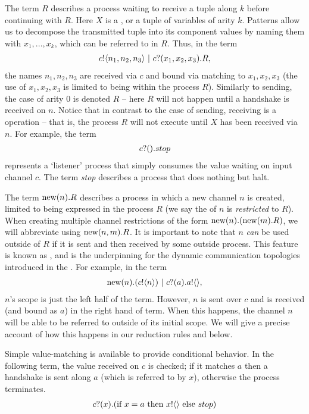 	The term $R$ describes a process waiting to receive a tuple along $k$ before continuing with $R$.  Here $X$ is a , or a tuple of variables of arity $k$.  Patterns allow us to decompose the transmitted tuple into its component values by naming them with $x_1,...,x_k$, which can be referred to in $R$.  Thus, in the term
	\begin{align}
		{c}!\langle{n_1,n_2,n_3}\rangle \ |\  {c}?({x_1,x_2,x_3}). R,
	\end{align}
the names $n_1,n_2,n_3$ are received via $c$ and bound via matching to $x_1,x_2,x_3$ (the use of $x_1,x_2,x_3$ is limited to being within the process $R$).  Similarly to sending, the case of arity 0 is denoted $R$ -- here $R$ will not happen until a handshake is received on $n$.  Notice that in contrast to the case of sending, receiving is a  operation -- that is, the process $R$ will not execute until $X$ has been received via $n$.  For example, the term
\begin{align}
	{c}?({}).stop
\end{align}
represents a `listener'	process that simply consumes the value waiting on input channel $c$.  The term \emph{stop} describes a process that does nothing but halt.

	The term $\text{new}({n}). R$ describes a process in which a new channel $n$ is created, limited to being expressed in the process $R$ (we say the  of $n$ is \emph{restricted} to $R$).  When creating multiple channel restrictions of the form $\text{new}({n}).(\text{new}({m}).R)$, we will abbreviate using $\text{new}({n,m}).R$.  It is important to note that $n$ \emph{can} be used outside of $R$ if it is sent and then received by some outside process.  This feature is known as , and is the underpinning for the dynamic communication topologies introduced in the \picalc.  For example, in the term
\begin{align}
	\text{new}({n}). ({c}!\langle{n}\rangle) \ |\  {c}?({a}). {a}!\langle{}\rangle,
\end{align}
	$n$'s scope is just the left half of the term.  However, $n$ is sent over $c$ and is received (and bound as $a$) in the right hand of term.  When this happens, the channel $n$ will be able to be referred to outside of its initial scope.  We will give a precise account of how this happens in our reduction rules and  below.
	
	Simple value-matching is available to provide conditional behavior.  In the following term, the value received on $c$ is checked; if it matches $a$ then a handshake is sent along $a$ (which is referred to by $x$), otherwise the process terminates.
	\begin{align}
		{c}?({x}).(\text{if } {x=a} \text{ then } {x}!\langle{}\rangle \text{ else } stop)
	\end{align}
	
